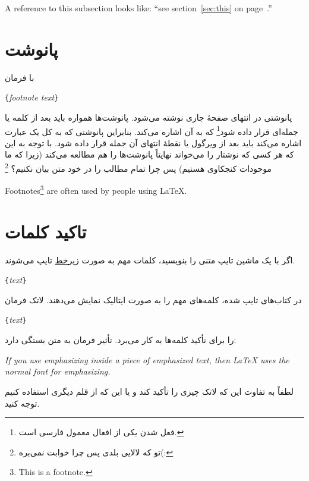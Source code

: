 \begin{example}
A reference to this subsection
\label{sec:this} looks like:
``see section~\ref{sec:this} on 
page~\pageref{sec:this}.''
\end{example}
\section{پانوشت}
با فرمان 

\begin{lscommand}
\verb|{|\emph{footnote text}\verb|}|
\end{lscommand}

\noindent 
پانوشتی در انتهای صفحهٔ جاری نوشته می‌شود. پانوشت‌ها همواره باید بعد از کلمه یا جمله‌ای قرار داده شود\footnote{فعل شدن یکی از افعال معمول فارسی است.}
 که به آن اشاره می‌کند. بنابراین پانوشتی که به کل یک عبارت اشاره می‌کند باید بعد از ویرگول یا نقطهٔ انتهای آن جمله قرار داده شود. با توجه به این که هر کسی که نوشتار را می‌خواند نهایتاً پانوشت‌ها را هم مطالعه می‌کند (زیرا که ما موجودات کنجکاوی هستیم) پس چرا تمام مطالب را در خود متن بیان نکنیم؟%
\footnote{تو که لالایی بلدی پس چرا خوابت نمی‌بره(\lr{-}:}


\begin{latin}
\begin{example}
Footnotes\footnote{This is 
  a footnote.} are often used 
by people using \LaTeX.
\end{example}
\end{latin}


\section{تاکید کلمات}
اگر با یک ماشین تایپ متنی را بنویسید، کلمات مهم به صورت 
\underline{زیرخط}
تایپ می‌شوند. 

\begin{lscommand}
\verb|{|\emph{text}\verb|}|
\end{lscommand}

در کتاب‌های تایپ شده، کلمه‌های مهم را به صورت ایتالیک  نمایش می‌دهند. لاتک فرمان 

\begin{lscommand}
\verb|{|\emph{text}\verb|}|
\end{lscommand}

\noindent
را برای تأکید کلمه‌ها به کار می‌برد. تأثیر فرمان به متن بستگی دارد:

\begin{example}
\emph{If you use 
  emphasizing inside a piece
  of emphasized text, then 
  \LaTeX{} uses the
  \emph{normal} font for 
  emphasizing.}
\end{example}
لطفاً به تفاوت این که لاتک چیزی را تأکید کند و یا این که از قلم دیگری استفاده کنیم توجه کنید.

